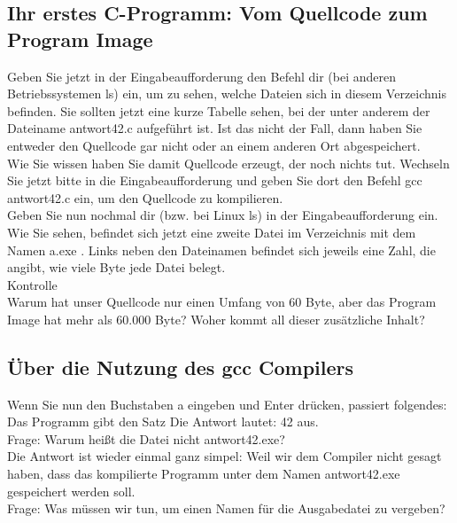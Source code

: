 \subsection{Ihr erstes C-Programm: Vom Quellcode zum Program Image}

Geben Sie jetzt in der Eingabeaufforderung den Befehl dir (bei anderen Betriebssystemen ls) ein, um zu sehen, welche Dateien sich in diesem Verzeichnis befinden. Sie sollten jetzt eine kurze Tabelle sehen, bei der unter anderem der Dateiname antwort42.c aufgeführt ist. Ist das nicht der Fall, dann haben Sie entweder den Quellcode gar nicht oder an einem anderen Ort abgespeichert.\\

Wie Sie wissen haben Sie damit Quellcode erzeugt, der noch nichts tut. Wechseln Sie jetzt bitte in die Eingabeaufforderung und geben Sie dort den Befehl gcc antwort42.c ein, um den Quellcode zu kompilieren.\\

Geben Sie nun nochmal dir (bzw. bei Linux ls) in der Eingabeaufforderung ein. Wie Sie sehen, befindet sich jetzt eine zweite Datei im Verzeichnis mit dem Namen a.exe . Links neben den Dateinamen befindet sich jeweils eine Zahl, die angibt, wie viele Byte jede Datei belegt.\\

Kontrolle\\

Warum hat unser Quellcode nur einen Umfang von 60 Byte, aber das Program Image hat mehr als 60.000 Byte? Woher kommt all dieser zusätzliche Inhalt?

\subsection{Über die Nutzung des gcc Compilers}

Wenn Sie nun den Buchstaben a eingeben und Enter drücken, passiert folgendes: Das Programm gibt den Satz Die Antwort lautet: 42 aus.\\

Frage: Warum heißt die Datei nicht antwort42.exe?\\

Die Antwort ist wieder einmal ganz simpel: Weil wir dem Compiler nicht gesagt haben, dass das kompilierte Programm unter dem Namen antwort42.exe gespeichert werden soll.\\

Frage: Was müssen wir tun, um einen Namen für die Ausgabedatei zu vergeben?\\

